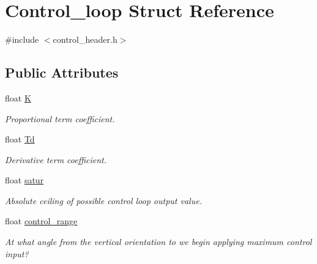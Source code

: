 \hypertarget{structControl__loop}{\section{Control\-\_\-loop Struct Reference}
\label{structControl__loop}
}


{\ttfamily \#include $<$control\-\_\-header.\-h$>$}

\subsection*{Public Attributes}
\begin{DoxyCompactItemize}
\item 
\hypertarget{structControl__loop_a2efe388ad1e4fb3c776e205cb33153fd}{float \hyperlink{structControl__loop_a2efe388ad1e4fb3c776e205cb33153fd}{K}}\label{structControl__loop_a2efe388ad1e4fb3c776e205cb33153fd}

\begin{DoxyCompactList}\small\item\em Proportional term coefficient. \end{DoxyCompactList}\item 
\hypertarget{structControl__loop_a674e7c09debbfd19a353a1f8021fc78e}{float \hyperlink{structControl__loop_a674e7c09debbfd19a353a1f8021fc78e}{Td}}\label{structControl__loop_a674e7c09debbfd19a353a1f8021fc78e}

\begin{DoxyCompactList}\small\item\em Derivative term coefficient. \end{DoxyCompactList}\item 
\hypertarget{structControl__loop_a9c7ed67be2cf5af577cbaa5ea7cce28d}{float \hyperlink{structControl__loop_a9c7ed67be2cf5af577cbaa5ea7cce28d}{satur}}\label{structControl__loop_a9c7ed67be2cf5af577cbaa5ea7cce28d}

\begin{DoxyCompactList}\small\item\em Absolute ceiling of possible control loop output value. \end{DoxyCompactList}\item 
\hypertarget{structControl__loop_a02d838eed6e69e1a58cc437f1a014665}{float \hyperlink{structControl__loop_a02d838eed6e69e1a58cc437f1a014665}{control\-\_\-range}}\label{structControl__loop_a02d838eed6e69e1a58cc437f1a014665}

\begin{DoxyCompactList}\small\item\em At what angle from the vertical orientation to we begin applying maximum control input? \end{DoxyCompactList}\end{DoxyCompactItemize}


